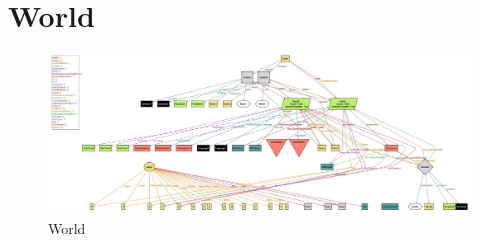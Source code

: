 \section[World]{World}
\begin{figure}[H]
    \centering
    \includegraphics[angle=90,scale = 0.5]{images/alloy/alloy.JPG}
    \caption{World}
\end{figure}